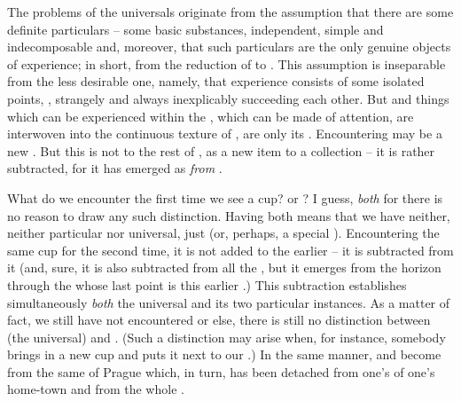 \pa The problems of the universals originate from the assumption that there
are some definite particulars -- some basic substances, independent, simple and
indecomposable and, moreover, that such particulars are the only genuine objects
of experience; in short, from the reduction of  to
. This assumption is inseparable from the less desirable one, 
namely, that experience consists of some isolated points, , strangely
and always inexplicably succeeding each other.  But 
  and things which can be experienced within the \hoa,
which can be made  of attention, are interwoven into the
continuous texture of , are only its .
Encountering  may be a new . But this is not  to the rest of , as a
new item to a collection --  it is 
rather subtracted, for it has emerged as  {\em from}
.

What do we encounter the first time we see a cup?  or ?
I guess, {\em both} for there is no reason to draw any such distinction. Having
both means that we have neither, neither particular nor universal, just
 (or, perhaps, a special ). Encountering the same cup for the
second time, it is not added to the earlier  -- it is subtracted from
it (and, sure, it is also subtracted from all the , but it emerges from
the horizon through the  whose last point is this earlier .)
This subtraction establishes simultaneously {\em both} the universal 
and its two particular instances.  As a matter of fact, we still have not
encountered  or else, there is still no distinction between (the
universal)  and . (Such a distinction may arise when, for
instance, somebody brings in a new cup and puts it next to our .)  In
the same manner,  and  become
 from the same  of Prague which, in turn, has been
detached from one's  of one's home-town and from the whole
.

